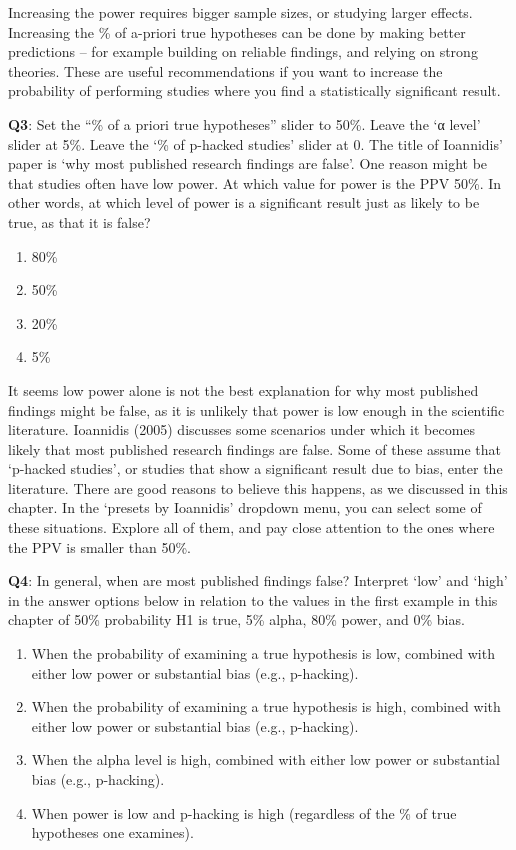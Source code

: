 \documentclass[
]{krantz}
\providecommand{\tightlist}{%
  \setlength{\itemsep}{0pt}\setlength{\parskip}{0pt}}
\begin{document}
Increasing the power requires bigger sample sizes, or studying larger effects. Increasing the \% of a-priori true hypotheses can be done by making better predictions -- for example building on reliable findings, and relying on strong theories. These are useful recommendations if you want to increase the probability of performing studies where you find a statistically significant result.

\textbf{Q3}: Set the ``\% of a priori true hypotheses'' slider to 50\%. Leave the `α level' slider at 5\%. Leave the `\% of p-hacked studies' slider at 0. The title of Ioannidis' paper is `why most published research findings are false'. One reason might be that studies often have low power. At which value for power is the PPV 50\%. In other words, at which level of power is a significant result just as likely to be true, as that it is false?

\begin{enumerate}
\def\labelenumi{\Alph{enumi})}
\tightlist
\item
  80\%
\item
  50\%
\item
  20\%
\item
  5\%
\end{enumerate}

It seems low power alone is not the best explanation for why most published findings might be false, as it is unlikely that power is low enough in the scientific literature. Ioannidis (2005) discusses some scenarios under which it becomes likely that most published research findings are false. Some of these assume that `p-hacked studies', or studies that show a significant result due to bias, enter the literature. There are good reasons to believe this happens, as we discussed in this chapter. In the `presets by Ioannidis' dropdown menu, you can select some of these situations. Explore all of them, and pay close attention to the ones where the PPV is smaller than 50\%.

\textbf{Q4}: In general, when are most published findings false? Interpret `low' and `high' in the answer options below in relation to the values in the first example in this chapter of 50\% probability H1 is true, 5\% alpha, 80\% power,
and 0\% bias.

\begin{enumerate}
\def\labelenumi{\Alph{enumi})}
\tightlist
\item
  When the probability of examining a true hypothesis is low, combined with either low power or substantial bias (e.g., p-hacking).
\item
  When the probability of examining a true hypothesis is high, combined with either low power or substantial bias (e.g., p-hacking).
\item
  When the alpha level is high, combined with either low power or substantial bias (e.g., p-hacking).
\item
  When power is low and p-hacking is high (regardless of the \% of true hypotheses one examines).
\end{enumerate}
\end{document}
